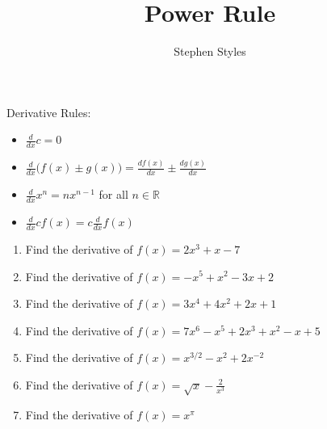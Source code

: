 \documentclass[12pt]{article}
\title{Power Rule}
\author{Stephen Styles}
\theoremstyle{remark}
\begin{document}
\maketitle
Derivative Rules:
\begin{itemize}
\item $\frac{d}{dx} c = 0$

\item $\frac{d}{dx} \bigg(f(x) \pm g(x) \bigg) = \frac{df(x)}{dx} \pm \frac{dg(x)}{dx} $

\item $\frac{d}{dx} x^n = n x^{n-1}$ for all $n \in \mathbb{R}$
\item $\frac{d}{dx} c f(x) = c \frac{d}{dx}  f(x)$
\end{itemize}
\vspace{1cm}
\begin{enumerate}
\item Find the derivative of $f(x) = 2x^3+x-7$
\vspace{3cm}
\item Find the derivative of $f(x) = -x^5+x^2-3x+2$
\vspace{3cm}
\item Find the derivative of $f(x) = 3x^4+4x^2+2x+1$
\vspace{4cm}
\item Find the derivative of $f(x) = 7x^6-x^5+2x^3+x^2-x+5$
\vspace{4cm}
\item Find the derivative of $f(x) = x^{3/2}-x^2+2x^{-2}$
\vspace{4cm}
\item Find the derivative of $\displaystyle{f(x) = \sqrt{x} - \frac{2}{x^3}}$
\vspace{4cm}
\item Find the derivative of $\displaystyle{f(x) = x^{\pi}}$
\vspace{4cm}
\end{enumerate}
\end{document}
